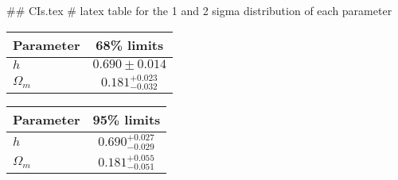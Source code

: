 ## CIs.tex
# latex table for the 1 and 2 sigma distribution of each parameter

\begin{tabular} { l  c}
 Parameter &  68\% limits\\
\hline
{\boldmath$h              $} & $0.690\pm 0.014            $\\
{\boldmath$\Omega_m       $} & $0.181^{+0.023}_{-0.032}   $\\
\hline
\end{tabular}

\begin{tabular} { l  c}
 Parameter &  95\% limits\\
\hline
{\boldmath$h              $} & $0.690^{+0.027}_{-0.029}   $\\
{\boldmath$\Omega_m       $} & $0.181^{+0.055}_{-0.051}   $\\
\hline
\end{tabular}
